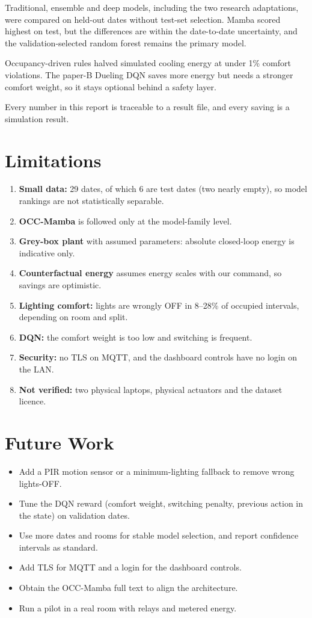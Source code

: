 \documentclass[12pt,a4paper,oneside]{report}
\begin{document}
Traditional, ensemble and deep models, including the two research adaptations, were compared on held-out dates
without test-set selection. Mamba scored highest on test, but the differences are within the date-to-date
uncertainty, and the validation-selected random forest remains the primary model.

Occupancy-driven rules halved simulated cooling energy at under 1\% comfort violations. The paper-B Dueling DQN saves
more energy but needs a stronger comfort weight, so it stays optional behind a safety layer.

Every number in this report is traceable to a result file, and every saving is a simulation result.

\section{Limitations}
\begin{enumerate}
\item \textbf{Small data:} 29 dates, of which 6 are test dates (two nearly empty), so model rankings are not
  statistically separable.
\item \textbf{OCC-Mamba} is followed only at the model-family level.
\item \textbf{Grey-box plant} with assumed parameters: absolute closed-loop energy is indicative only.
\item \textbf{Counterfactual energy} assumes energy scales with our command, so savings are optimistic.
\item \textbf{Lighting comfort:} lights are wrongly OFF in 8--28\% of occupied intervals, depending on room and split.
\item \textbf{DQN:} the comfort weight is too low and switching is frequent.
\item \textbf{Security:} no TLS on MQTT, and the dashboard controls have no login on the LAN.
\item \textbf{Not verified:} two physical laptops, physical actuators and the dataset licence.
\end{enumerate}

\section{Future Work}
\begin{itemize}
\item Add a PIR motion sensor or a minimum-lighting fallback to remove wrong lights-OFF.
\item Tune the DQN reward (comfort weight, switching penalty, previous action in the state) on validation dates.
\item Use more dates and rooms for stable model selection, and report confidence intervals as standard.
\item Add TLS for MQTT and a login for the dashboard controls.
\item Obtain the OCC-Mamba full text to align the architecture.
\item Run a pilot in a real room with relays and metered energy.
\end{itemize}
\end{document}
